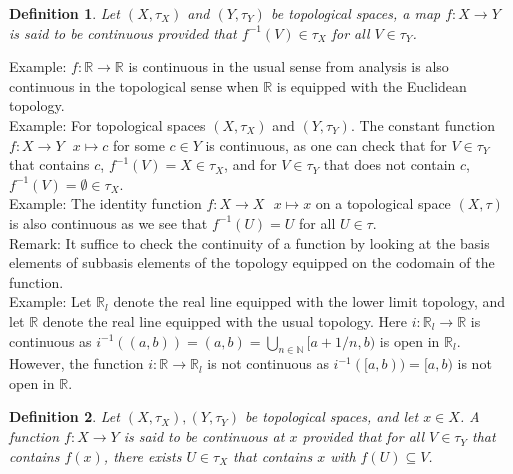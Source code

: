 \documentclass[11pt]{book}
\theoremstyle{break}
\theoremstyle{break}
\newtheorem{defn}{Definition}[corL]
\newcommand{\R}{\mathbb{R}}
\newcommand{\N}{\mathbb{N}}
\newcommand{\remark}{\color{blue}Remark: \color{black}}
\newcommand{\example}{\color{green}Example: \color{black}}
\begin{document}
\begin{defn}
Let $(X,\tau_X)$ and $(Y,\tau_Y)$ be topological spaces, a map $f:X \to Y$ is said to be continuous provided that $f^{-1}(V) \in \tau_X$ for all $V \in \tau_Y$. 
\end{defn}

\example $f:\R \to \R$ is continuous in the usual sense from analysis is also continuous in the topological sense when $\R$ is equipped with the Euclidean topology.\\

\example For topological spaces $(X,\tau_X)$ and $(Y,\tau_Y)$. The constant function $f:X \to Y \ \ \ x\mapsto c$ for some $c \in Y$ is continuous, as one can check that for $V \in \tau_Y$ that contains $c$, $f^{-1}(V) = X\in \tau_X$, and for $V \in \tau_Y $ that does not contain $c$, $f^{-1}(V) = \emptyset\in \tau_X$. \\

\example The identity function $f:X \to X \ \ \ x\mapsto x$ on a topological space $(X,\tau)$ is also continuous as we see that $f^{-1}(U) = U$ for all $U\in \tau$.\\

\remark It suffice to check the continuity of a function by looking at the basis elements of subbasis elements of the topology equipped on the codomain of the function.\\

\example Let $\R_l$ denote the real line equipped with the lower limit topology, and let $\R$ denote the real line equipped with the usual topology. Here $i:\R_l \to \R$ is continuous as $i^{-1}((a,b)) = (a,b) = \bigcup_{n\in \N}[a+1/n, b)$ is open in $\R_l$. However, the function $i:\R \to \R_l$ is not continuous as $i^{-1}([a,b)) = [a,b)$ is not open in $\R$. \\

\begin{defn}
Let $(X,\tau_X), (Y,\tau_Y)$ be topological spaces, and let $x \in X$. A function $f:X\to Y$ is said to be continuous at $x$ provided that for all $V\in \tau_Y$ that contains $f(x)$, there exists $U\in \tau_X$ that contains $x$ with $f(U) \subseteq V$. 
\end{defn}
\end{document}
